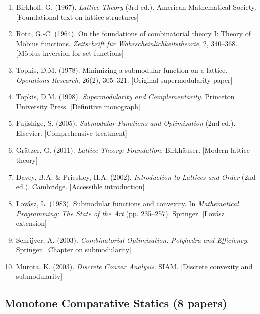 \begin{enumerate}
    \item Birkhoff, G. (1967). \textit{Lattice Theory} (3rd ed.). American Mathematical Society. [Foundational text on lattice structures]

    \item Rota, G.-C. (1964). On the foundations of combinatorial theory I: Theory of Möbius functions. \textit{Zeitschrift für Wahrscheinlichkeitstheorie}, 2, 340--368. [Möbius inversion for set functions]

    \item Topkis, D.M. (1978). Minimizing a submodular function on a lattice. \textit{Operations Research}, 26(2), 305--321. [Original supermodularity paper]

    \item Topkis, D.M. (1998). \textit{Supermodularity and Complementarity}. Princeton University Press. [Definitive monograph]

    \item Fujishige, S. (2005). \textit{Submodular Functions and Optimization} (2nd ed.). Elsevier. [Comprehensive treatment]

    \item Grätzer, G. (2011). \textit{Lattice Theory: Foundation}. Birkhäuser. [Modern lattice theory]

    \item Davey, B.A. \& Priestley, H.A. (2002). \textit{Introduction to Lattices and Order} (2nd ed.). Cambridge. [Accessible introduction]

    \item Lovász, L. (1983). Submodular functions and convexity. In \textit{Mathematical Programming: The State of the Art} (pp. 235--257). Springer. [Lovász extension]

    \item Schrijver, A. (2003). \textit{Combinatorial Optimization: Polyhedra and Efficiency}. Springer. [Chapter on submodularity]

    \item Murota, K. (2003). \textit{Discrete Convex Analysis}. SIAM. [Discrete convexity and submodularity]
\end{enumerate}

\subsection{Monotone Comparative Statics (8 papers)}

